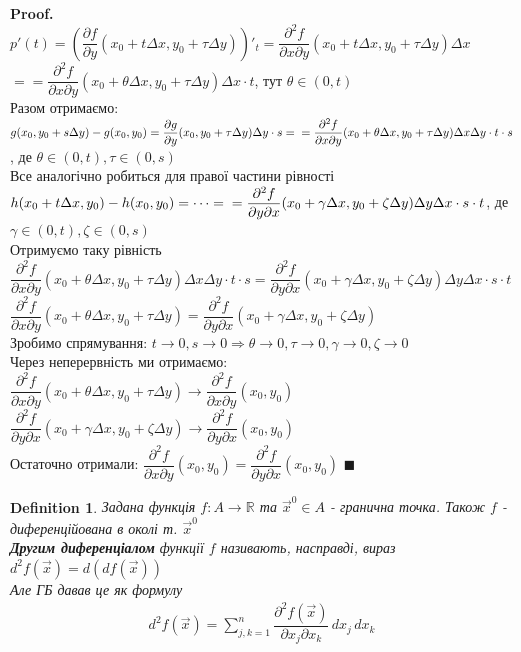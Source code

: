 \documentclass[a4paper, 14pt]{extarticle}
\def\bigline{\vspace{5mm}\\}
\theoremstyle{theoremdd}
\theoremstyle{theoremdd}
\newtheorem{definition}[theorem]{Definition}
\theoremstyle{theoremdd}
\theoremstyle{theoremdd}
\theoremstyle{theoremdd}
\theoremstyle{theoremdd}
\theoremstyle{theoremdd}
\theoremstyle{theoremdd}
\newenvironment{pf}{\vspace*{-3mm} \textbf{Proof. \\}}{$\blacksquare$}
\def\departial#1#2{\dfrac{\partial {#1}}{\partial {#2}}}
\begin{document}
\begin{pf}
$p'(t)= \left(\departial{f}{y}(x_0+t\Delta x, y_0+\tau \Delta y) \right)'_t = \dfrac{\partial^2 f}{\partial x \partial y} (x_0 + t \Delta x, y_0 + \tau \Delta y) \Delta x$\\
$\boxed{=} = \dfrac{\partial^2 f}{\partial x \partial y} (x_0+\theta \Delta x, y_0 + \tau \Delta y) \Delta x \cdot t$, тут $\theta \in (0,t)$\\
Разом отримаємо:\\
$g(x_0,y_0+s\Delta y) - g(x_0,y_0) = \departial{g}{y}(x_0,y_0+\tau \Delta y) \Delta y \cdot s = \\ = \dfrac{\partial^2 f}{\partial x \partial y} (x_0+\theta \Delta x, y_0 + \tau \Delta y) \Delta x \Delta y \cdot t \cdot s$, де $\theta \in (0,t), \tau \in (0,s)$
\bigline
Все аналогічно робиться для правої частини рівності\\
$h(x_0+t\Delta x, y_0) - h(x_0,y_0) = \cdots = \\ = \dfrac{\partial^2 f}{\partial y \partial x} (x_0 + \gamma \Delta x, y_0 + \zeta \Delta y) \Delta y \Delta x \cdot s \cdot t$, де $\gamma \in (0,t), \zeta \in (0,s)$
\bigline
Отримуємо таку рівність\\
$\dfrac{\partial^2 f}{\partial x \partial y} (x_0+\theta \Delta x, y_0 + \tau \Delta y) \Delta x \Delta y \cdot t \cdot s = \dfrac{\partial^2 f}{\partial y \partial x} (x_0 + \gamma \Delta x, y_0 + \zeta \Delta y) \Delta y \Delta x \cdot s \cdot t$\\
$\dfrac{\partial^2 f}{\partial x \partial y} (x_0+\theta \Delta x, y_0 + \tau \Delta y) = \dfrac{\partial^2 f}{\partial y \partial x} (x_0 + \gamma \Delta x, y_0 + \zeta \Delta y)$\\
Зробимо спрямування: $t \to 0, s \to 0 \Rightarrow \theta \to 0, \tau \to 0, \gamma \to 0, \zeta \to 0$\\
Через неперервність ми отримаємо:\\
$\dfrac{\partial^2 f}{\partial x \partial y} (x_0+\theta \Delta x, y_0 + \tau \Delta y) \to \dfrac{\partial^2 f}{\partial x \partial y}(x_0,y_0)$\\
$\dfrac{\partial^2 f}{\partial y \partial x} (x_0 + \gamma \Delta x, y_0 + \zeta \Delta y) \to \dfrac{\partial^2 f}{\partial y \partial x}(x_0,y_0)$\\
Остаточно отримали: $\dfrac{\partial^2 f}{\partial x \partial y}(x_0,y_0) = \dfrac{\partial^2 f}{\partial y \partial x}(x_0,y_0)$
\end{pf}

\begin{definition}
Задана функція $f: A \to \mathbb{R}$ та $\vec{x}^0 \in A$ - гранична точка. Також $f$ - диференційована в околі т. $\vec{x}^0$\\
\textbf{Другим диференціалом} функції $f$ називають, насправді, вираз \\ $d^2f(\vec{x}) = d(df(\vec{x}))$\\
Але ГБ давав це як формулу
\begin{align*}
d^2 f(\vec{x}) = \sum_{j,k=1}^n \dfrac{\partial^2 f(\vec{x})}{\partial x_j \partial x_k} \,dx_j \,dx_k
\end{align*}
\end{definition}
\end{document}
